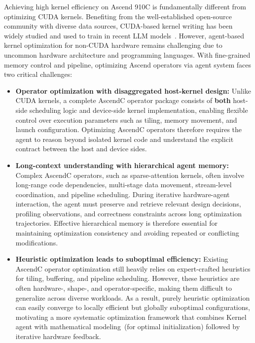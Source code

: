 Achieving high kernel efficiency on Ascend 910C is fundamentally different from optimizing CUDA kernels. 
Benefiting from the well-established open-source community with diverse data sources, CUDA-based kernel writing has been widely studied and used to train in recent LLM models~\citep{dao2022flashattention,dao2023flashattention2,shah2024flashattention3,tillet2019triton,hsu2024liger,ye2025flashinfer,wei2025astra,dong2025stark}. 
However, agent-based kernel optimization for non-CUDA hardware remains challenging due to uncommon hardware architecture and programming languages. 
With fine-grained memory control and pipeline, optimizing Ascend operators via agent system faces two critical challenges: 
\begin{itemize}
\item \textbf{Operator optimization with disaggregated host-kernel design:}
Unlike CUDA kernels, a complete AscendC operator package consists of \textbf{both} host-side scheduling logic and device-side kernel implementation, enabling flexible control over execution parameters such as tiling, memory movement, and launch configuration. Optimizing AscendC operators therefore requires the agent to reason beyond isolated kernel code and understand the explicit contract between the host and device sides.

\item \textbf{Long-context understanding with hierarchical agent memory:} 
Complex AscendC operators, such as sparse-attention kernels, often involve long-range code dependencies, multi-stage data movement, stream-level coordination, and pipeline scheduling. During iterative hardware-agent interaction, the agent must preserve and retrieve relevant design decisions, profiling observations, and correctness constraints across long optimization trajectories. Effective hierarchical memory is therefore essential for maintaining optimization consistency and avoiding repeated or conflicting modifications.

\item \textbf{Heuristic optimization leads to suboptimal efficiency:} 
Existing AscendC operator optimization still heavily relies on expert-crafted heuristics for tiling, buffering, and pipeline scheduling. However, these heuristics are often hardware-, shape-, and operator-specific, making them difficult to generalize across diverse workloads. 
As a result, purely heuristic optimization can easily converge to locally efficient but globally suboptimal configurations, motivating a more systematic optimization framework that combines Kernel agent with mathematical modeling~(for optimal initialization) followed by iterative hardware feedback.
\end{itemize}

